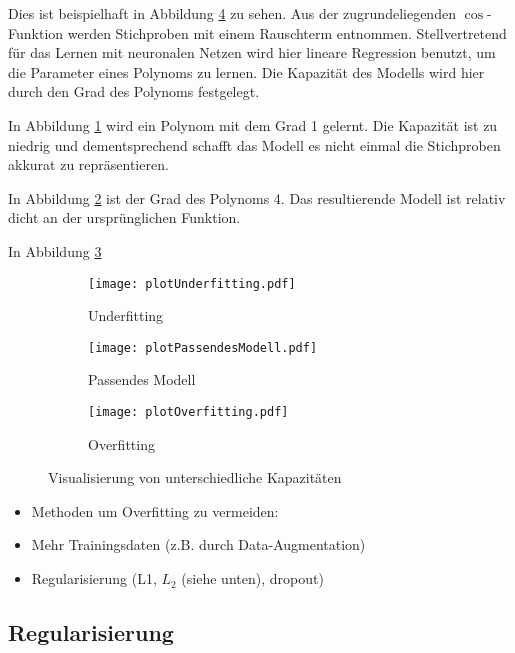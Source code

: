 Dies ist beispielhaft in Abbildung \ref{fig:capacity} zu sehen.
Aus der zugrundeliegenden \( \cos \)-Funktion werden Stichproben mit einem Rauschterm entnommen. 
Stellvertretend für das Lernen mit neuronalen Netzen wird hier lineare Regression benutzt,
um die Parameter eines Polynoms zu lernen.
Die Kapazität des Modells wird hier durch den Grad des Polynoms festgelegt.

In Abbildung \ref{subfig:underfitting} wird ein Polynom mit dem Grad 1 gelernt.
Die Kapazität ist zu niedrig und dementsprechend schafft das Modell es nicht einmal die Stichproben akkurat zu repräsentieren.

In Abbildung \ref{subfig:rightfitting} ist der Grad des Polynoms 4.
Das resultierende Modell ist relativ dicht an der ursprünglichen Funktion.

In Abbildung \ref{subfig:overfitting}

\begin{figure}[h]
    \centering
	
	\begin{subfigure}[t]{0.4\textwidth}
		\texttt{[image: plotUnderfitting.pdf]}
		\caption{Underfitting}
		\label{subfig:underfitting}
    \end{subfigure}
	\begin{subfigure}[t]{0.4\textwidth}
		\texttt{[image: plotPassendesModell.pdf]}
		\caption{Passendes Modell}
		\label{subfig:rightfitting}
	\end{subfigure}
	\quad
	\begin{subfigure}[t]{0.8\textwidth}
        \texttt{[image: plotOverfitting.pdf]}
		\caption{Overfitting}
		\label{subfig:overfitting}
	\end{subfigure}
	\caption{Visualisierung von unterschiedliche Kapazitäten}
	\label{fig:capacity}
\end{figure}

\begin{itemize}
	\item Methoden um Overfitting zu vermeiden:
	\item Mehr Trainingsdaten (z.B. durch Data-Augmentation)
	\item Regularisierung (L1, \(L_2\) (siehe unten), dropout)
\end{itemize}


\subsection{Regularisierung}

